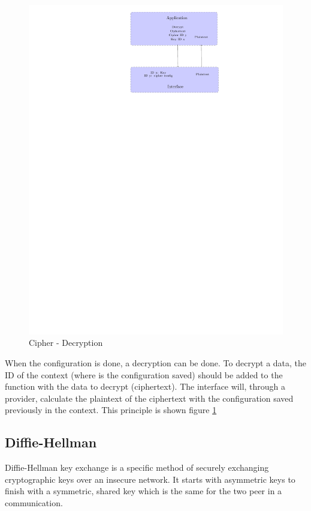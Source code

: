\begin{figure}[!ht]
\centering
\includegraphics[trim=16cm 20cm 9.5cm 0cm]{figures/cipher_decrypt.pdf}
\caption{Cipher - Decryption\newline}
\label{fig:gci_cipher_decrypt}
\end{figure}
When the configuration is done, a decryption can be done.
To decrypt a data, the ID of the context (where is the configuration saved)
should be added to the function with the data to decrypt (ciphertext).
The interface will, through a provider, calculate the plaintext of the
ciphertext with the configuration saved previously in the context.
This principle is shown figure \ref{fig:gci_cipher_decrypt}


\subsection{Diffie-Hellman}
\label{gci_dh}

Diffie-Hellman key exchange is a specific method of securely exchanging
cryptographic keys over an insecure network. It starts with asymmetric keys to finish with a
symmetric, shared key which is the same for the two peer in a communication.

